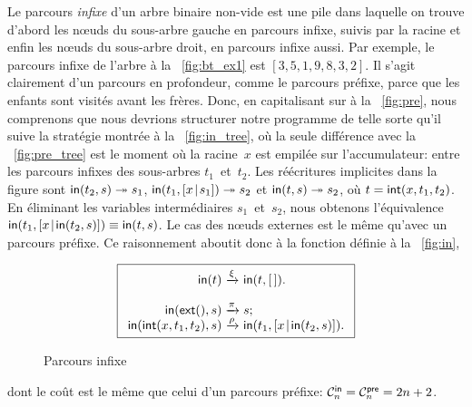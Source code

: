 Le parcours \emph{infixe} d'un arbre binaire non-vide est une pile
dans laquelle on trouve d'abord les nœuds du sous-arbre gauche en
parcours infixe, suivis par la racine et enfin les nœuds du
sous-arbre droit, en parcours infixe aussi. Par exemple, le parcours
infixe de l'arbre à la \fig~\vref{fig:bt_ex1} est
\([3,5,1,9,8,3,2]\). Il s'agit clairement d'un parcours en profondeur,
comme le parcours préfixe, parce que les enfants sont visités avant
les frères. Donc, en capitalisant sur
 à la \fig~\vref{fig:pre}, nous
comprenons que nous devrions structurer notre programme de telle sorte
qu'il suive la stratégie montrée à la \fig~\vref{fig:in_tree}, où la
seule différence avec la \fig~\ref{fig:pre_tree} est le moment où la
racine~\(x\) est empilée sur l'accumulateur: entre les parcours infixes des
sous-arbres \(t_1\)~et~\(t_2\). Les réécritures implicites dans la
figure sont \(\fun{in}(t_2,s) \twoheadrightarrow
s_1\), \(\fun{in}(t_1,\cons{x}{s_1})
\twoheadrightarrow s_2\) et \(\fun{in}(t,s) \twoheadrightarrow s_2\),
où \(t=\fun{int}(x,t_1,t_2)\). En éliminant les variables
intermédiaires \(s_1\)~et~\(s_2\), nous obtenons l'équivalence
\(\fun{in}(t_1,\cons{x}{\fun{in}(t_2,s)}) \equiv \fun{in}(t,s)\). Le
cas des nœuds externes est le même qu'avec un parcours préfixe. Ce
raisonnement aboutit donc à la fonction définie à la
\fig~\vref{fig:in},
\begin{figure}
\begin{equation*}
\boxed{
\begin{array}{r@{\;}c@{\;}l}
\fun{in}(t) & \xrightarrow{\xi} & \fun{in}(t,\el).\\
\\
\fun{in}(\fun{ext}(),s) & \xrightarrow{\smash{\pi}} & s;\\
\fun{in}(\fun{int}(x,t_1,t_2),s)
  & \xrightarrow{\smash{\rho}}
  & \fun{in}(t_1,\cons{x}{\fun{in}(t_2,s)}).
\end{array}}
\end{equation*}
\caption{Parcours infixe}
\label{fig:in}
\end{figure}
dont le coût est le même que celui d'un parcours préfixe:
\(\C{\fun{in}}{n} = \C{\fun{pre}}{n} = 2n +
2\).

